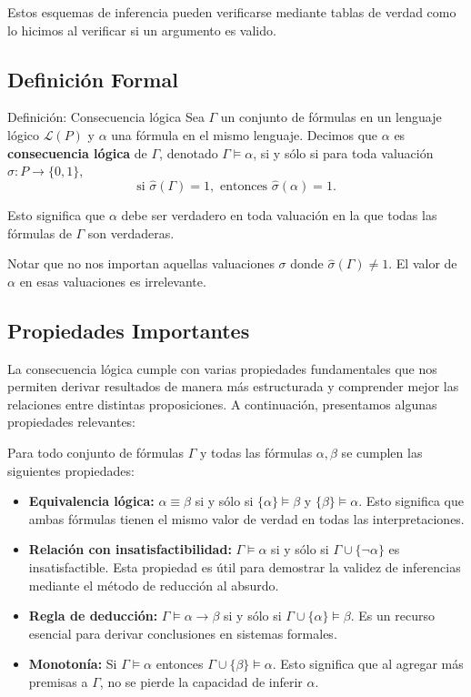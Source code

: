 Estos esquemas de inferencia pueden verificarse mediante tablas de verdad como lo hicimos al verificar si un argumento es valido.


\subsection{Definición Formal}

\begin{thmblock}{Definición: Consecuencia lógica} Sea $\Gamma$ un conjunto de fórmulas en un lenguaje lógico $\mathcal{L}(P)$ y $\alpha$ una fórmula en el mismo lenguaje. Decimos que $\alpha$ es \textbf{consecuencia lógica} de $\Gamma$, denotado $\Gamma \models \alpha$, si y sólo si para toda valuación $\sigma : P \to \{0,1\}$,
\[ \text{si } \hat{\sigma}(\Gamma) = 1, \text{ entonces } \hat{\sigma}(\alpha) = 1. \]

Esto significa que $\alpha$ debe ser verdadero en toda valuación en la que todas las fórmulas de $\Gamma$ son verdaderas.
\end{thmblock}

Notar que no nos importan aquellas valuaciones $\sigma$ donde $\hat{\sigma}(\Gamma) \neq 1$. El valor de $\alpha$  en esas valuaciones es irrelevante.

\subsection{Propiedades Importantes}

La consecuencia lógica cumple con varias propiedades fundamentales que nos permiten derivar resultados de manera más estructurada y comprender mejor las relaciones entre distintas proposiciones. A continuación, presentamos algunas propiedades relevantes:


Para todo conjunto de fórmulas $\Gamma$ y todas las fórmulas $\alpha, \beta$ se cumplen las siguientes propiedades:

\begin{itemize}
    \item \textbf{Equivalencia lógica:} $\alpha \equiv \beta$ si y sólo si $\{\alpha\} \models \beta$ y $\{\beta\} \models \alpha$. Esto significa que ambas fórmulas tienen el mismo valor de verdad en todas las interpretaciones.
    
    \item \textbf{Relación con insatisfactibilidad:} $\Gamma \models \alpha$ si y sólo si $\Gamma \cup \{\neg \alpha\}$ es insatisfactible. Esta propiedad es útil para demostrar la validez de inferencias mediante el método de reducción al absurdo.
    
    \item \textbf{Regla de deducción:} $\Gamma \models \alpha \rightarrow \beta$ si y sólo si $\Gamma \cup \{\alpha\} \models \beta$. Es un recurso esencial para derivar conclusiones en sistemas formales.
    
    \item \textbf{Monotonía:} Si $\Gamma \models \alpha$ entonces $\Gamma \cup \{ \beta \} \models \alpha$. Esto significa que al agregar más premisas a $\Gamma$, no se pierde la capacidad de inferir $\alpha$.
\end{itemize}

